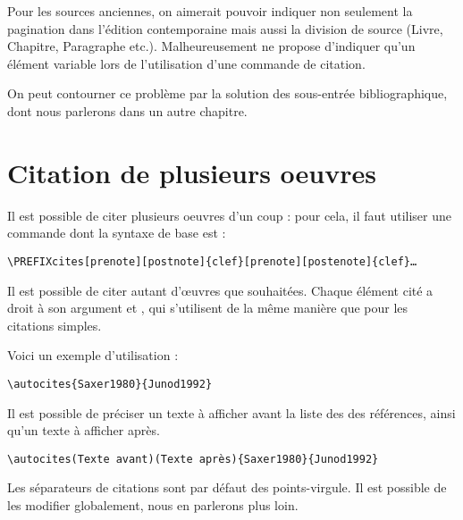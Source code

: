 \begin{quotation}
\cite[24 passage au demeurant fort intéressant.]{Junod1992}
\end{quotation}

\begin{attention}
Pour les sources anciennes, on aimerait pouvoir indiquer non seulement la pagination dans l'édition contemporaine mais aussi la division de source (Livre, Chapitre, Paragraphe etc.). Malheureusement  ne propose d'indiquer qu'un élément variable lors de l'utilisation d'une commande de citation.

On peut contourner ce problème par la solution des sous-entrée bibliographique, dont nous parlerons dans un autre chapitre. 
\end{attention}

\section{Citation de plusieurs oeuvres}\label{citemultiple}

Il est possible de citer plusieurs oeuvres d'un coup : pour cela, il faut utiliser une commande dont la syntaxe de base est :


\begin{verbatim}
\PREFIXcites[prenote][postnote]{clef}[prenote][postenote]{clef}…
\end{verbatim}

Il est possible de citer autant d'œuvres que souhaitées. Chaque élément cité a droit à son argument  et , qui s'utilisent de la même manière que pour les citations simples.


Voici un exemple d'utilisation : 

\begin{verbatim}
\autocites{Saxer1980}{Junod1992}
\end{verbatim}

\begin{quotation}
\cites{Saxer1980}{Junod1992}
\end{quotation}

Il est possible de préciser un texte à afficher avant la liste des des références, ainsi qu'un texte à afficher après.

\begin{verbatim}
\autocites(Texte avant)(Texte après){Saxer1980}{Junod1992}
\end{verbatim}

Les séparateurs de citations sont par défaut des points-virgule. Il est possible de les modifier globalement, nous en parlerons plus loin.

